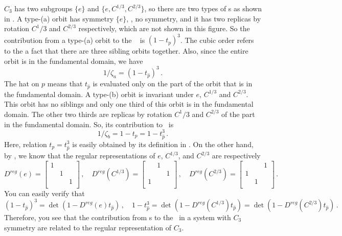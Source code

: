 $C_3$ has two subgroups $\{e\}$ and $\{e, C^{1/3}, C^{2/3}\}$, so there are
two types of \po s as shown in . A type-(a) orbit
has symmetry
$\{e\}$, \ie, no symmetry, and it has two replicas by rotation $C^1/3$  and $C^{2/3}$
respectively, which are not shown in this figure. So the contribution from
a type-(a) orbit to the \dzeta\  is $(1-t_p)^3$.
The cubic order refers to the a fact that there are three sibling orbits together.
Also, since the entire orbit is in the fundamental domain, we have
\[
  1/\zeta_a = (1 - t_{\hat{p}})^3
  \,.
\]
The hat on $p$ means that $t_{\hat{p}}$ is evaluated only on the part of the orbit that
is in the fundamental domain.
A type-(b) orbit is invariant under $e$, $C^{1/3}$ and $C^{2/3}$.
This orbit has no siblings and only one third
of this orbit is in the fundamental domain. The other two thirds are replicas
by rotation $C^1/3$  and $C^{2/3}$ of the part in the fundamental domain. So, its
contribution to \dzeta\ is
\[
  1/\zeta_b = 1 - t_p = 1 - t_{\hat{p}}^3
  \,.
\]
Here, relation $t_p= t_{\hat{p}}^3$ is easily obtained by its definition in
.
On the other hand, by ,
we know that the regular representations of $e$,
$C^{1/3}$, and $C^{2/3}$ are respectively
\[
  D^{reg}(e) = %
  \begin{bmatrix}
    1 & & \\
    & 1 & \\
    & & 1 \\
  \end{bmatrix} \,,  \quad
  D^{reg}(C^{1/3}) = %
  \begin{bmatrix}
    ~ & 1 & ~\\
    ~ & ~ & 1\\
    1 & ~ & ~ \\
  \end{bmatrix}\,,  \quad
  D^{reg}(C^{2/3}) =
  \begin{bmatrix}
    ~ & ~ & 1\\
    1 & ~ & ~\\
    ~ & 1 & ~ \\
  \end{bmatrix}
  \,.
\]
You can easily verify that
\[
 (1 - t_{\hat{p}})^3 = \det(1 - D^{reg}(e)t_{\hat{p}}) \,, \quad
 1 - t_{\hat{p}}^3 = \det(1 - D^{reg}(C^{1/3})t_{\hat{p}}) =
 \det(1 - D^{reg}(C^{2/3})t_{\hat{p}})\,.
\]
Therefore, you see that the contribution from \po s to the
\dzeta\ in a system with $C_3$
symmetry are related to the regular representation of $C_3$.

